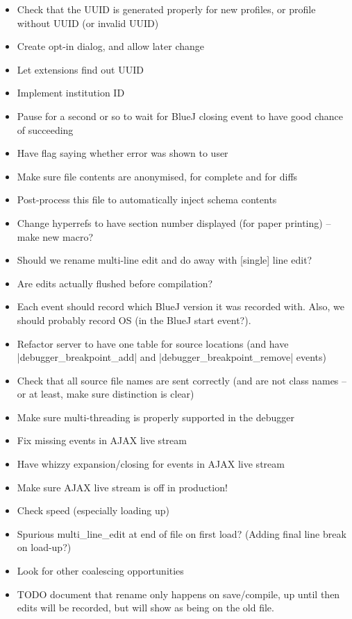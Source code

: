 \documentclass{book}
\begin{document}
\begin{itemize}
\item Check that the UUID is generated properly for new profiles, or profile without
UUID (or invalid UUID)
\item Create opt-in dialog, and allow later change
\item Let extensions find out UUID
\item Implement institution ID
\item Pause for a second or so to wait for BlueJ closing event to have good
  chance of succeeding
\item Have flag saying whether error was shown to user
\item Make sure file contents are anonymised, for complete and for diffs
\item Post-process this file to automatically inject schema contents
\item Change hyperrefs to have section number displayed (for paper printing)
  -- make new macro?
\item Should we rename multi-line edit and do away with [single] line edit?
\item Are edits actually flushed before compilation?
\item Each event should record which BlueJ version it was recorded with.
  Also, we should probably record OS (in the BlueJ start event?).
\item Refactor server to have one table for source locations (and have
  |debugger_breakpoint_add| and |debugger_breakpoint_remove| events)
\item Check that all source file names are sent correctly (and are not class
  names -- or at least, make sure distinction is clear)
\item Make sure multi-threading is properly supported in the debugger
\item Fix missing events in AJAX live stream
\item Have whizzy expansion/closing for events in AJAX live stream
\item Make sure AJAX live stream is off in production!
\item Check speed (especially loading up)
\item Spurious multi_line_edit at end of file on first load? (Adding final
  line break on load-up?)
\item Look for other coalescing opportunities
\item TODO document that rename only happens on save/compile, up until then
  edits will be recorded, but will show as being on the old file.
\end{itemize}
\end{document}
